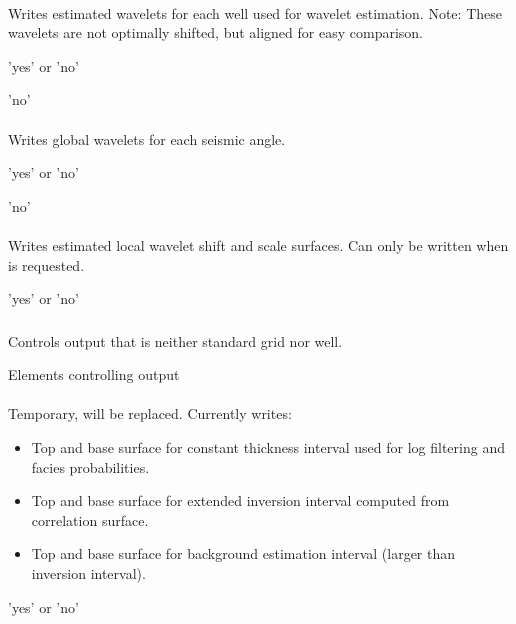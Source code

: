 \paragraph{}
 \slist
   \item \Description Writes estimated wavelets for each well used for wavelet estimation. Note: These wavelets are not optimally shifted, but aligned for easy comparison.
	\item \Argument 'yes' or 'no'
	\item \Default 'no'
 \elist

\paragraph{}
 \slist
   \item \Description Writes global wavelets for each seismic angle.
	\item \Argument 'yes' or 'no'
	\item \Default 'no'
 \elist

\paragraph{}
 \slist
   \item \Description Writes estimated local wavelet shift and scale surfaces. Can only be written when  is requested.
	\item \Argument 'yes' or 'no'
	\item \Default
 \elist

\subsubsection{}
 \slist
   \item \Description Controls output that is neither standard grid nor well.
   \item \Argument Elements controlling output
   \item \Default
 \elist

\paragraph{}
 \slist
   \item \Description Temporary, will be replaced. Currently writes:
   \begin{itemize}
   \item Top and base surface for constant thickness interval used for log filtering and facies probabilities.
   \item Top and base surface for extended inversion interval computed from correlation surface.
   \item Top and base surface for background estimation interval (larger than inversion interval).
   \end{itemize}
   \item \Argument 'yes' or 'no'
   \item \Default
 \elist

